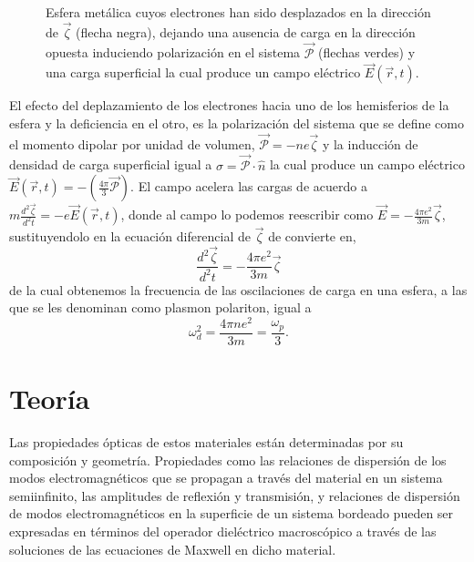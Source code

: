 \documentclass[12pt]{article}
\begin{document}
\begin{figure}[H]
\begin{tikzpicture}[x=0.75pt,y=0.75pt,yscale=-1,xscale=1]
\end{tikzpicture}

\caption{Esfera metálica cuyos electrones han sido desplazados en la
  dirección de $\vec{\zeta}$ (flecha negra), dejando una ausencia de
  carga en la dirección opuesta induciendo polarización en el sistema
  $\vec{\mathcal{P}}$ (flechas verdes) y una carga superficial la cual
  produce un campo eléctrico $\vec{E}(\vec{r},t)$.}
\label{Polariton}

\end{figure}

El efecto del deplazamiento de los electrones hacia uno de los
hemisferios de la esfera y la deficiencia en el otro, es la
polarización del sistema que se define como el momento dipolar por
unidad de volumen, $\vec{\mathcal{P}} =-ne\vec{\zeta}$ y la inducción
de densidad de carga superficial igual a $\sigma
=\vec{\mathcal{P}}\cdot \hat{n}$ la cual produce un campo eléctrico
$\vec{E}(\vec{r},t) = -\left(\frac{4\pi}{3}\vec{\mathcal{P}}\right)
$. El campo acelera las cargas de acuerdo a
$m\frac{d^{2}\vec{\zeta}}{d^{2}t}=-e\vec{E}(\vec{r},t)$, donde al
campo lo podemos reescribir como $\vec{E}= -\frac{4\pi
  e^{2}}{3m}\vec{\zeta}$, sustituyendolo en la ecuación diferencial de
$\vec{\zeta}$ de convierte en,
\begin{equation}
  \frac{d^{2}\vec{\zeta}}{d^{2}t}= -\frac{4\pi e^{2}}{3m}\vec{\zeta}
  \label{polaritondifec}
\end{equation}
de la cual obtenemos la frecuencia de las oscilaciones de carga en una
esfera, a las que se les denominan como plasmon polariton, igual a
\begin{equation}
  \omega_{d}^{2} = \frac{4\pi n e^{2}}{3m} = \frac{\omega_{p}}{3}.
\end{equation}


\section{Teoría}

Las propiedades ópticas de estos materiales están determinadas por su
composición y geometría. Propiedades como las relaciones de dispersión
de los modos electromagnéticos que se propagan a través del material
en un sistema semiinfinito, las amplitudes de reflexión y transmisión,
y relaciones de dispersión de modos electromagnéticos en la superficie
de un sistema bordeado pueden ser expresadas en términos del operador
dieléctrico macroscópico a través de las soluciones de las ecuaciones
de Maxwell en dicho material.
\end{document}
